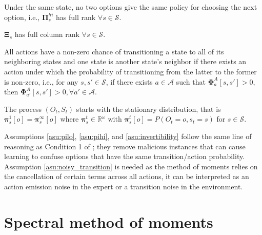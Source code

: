 \begin{assumption}\label{asu:pihi}
Under the same state, no two options give the same policy for choosing the next option, i.e., $\bm{\Pi}^{hi}_s$ has full rank $\forall s\in\mathcal{S}$. 
\end{assumption}

\begin{assumption}\label{asu:invertibility}
$\bm{\Xi}_s$ has full column rank $\forall s\in\mathcal{S}$.
\end{assumption}

\begin{assumption}\label{asu:noisy_transition}
All actions have a non-zero chance of transitioning a state to all of its neighboring states and one state is another state's neighbor if there exists an action under which the probability of transitioning from the latter to the former is non-zero, i.e., for any $s,s'\in\mathcal{S}$, if there exists $a\in\mathcal{A}$ such that $\bm{\Phi}^A_a[s,s']>0$, then $\bm{\Phi}^A_{a'}[s,s']>0,\forall a'\in\mathcal{A}.$
\end{assumption}

\begin{assumption}[Stationary]\label{asu:stationary}
The process $(O_t,S_t)$ starts with the stationary distribution, that is $\bm{\pi}^1_s[o]=\bm{\pi}^\infty_s[o]$ where $\bm{\pi}^t_s\in\mathbb{R}^\omega$ with $\bm{\pi}^t_s[o]=P(O_t=o,s_t=s)$ for $s \in \mathcal{S}$.
\end{assumption}
\begin{remark}
Assumptions \ref{asu:pilo}, \ref{asu:pihi}, and \ref{asu:invertibility} follow the same line of reasoning as Condition 1 of \cite{hsu08}; they remove malicious instances that can cause learning to confuse options that have the same transition/action probability. Assumption \ref{asu:noisy_transition} is needed as the method of moments relies on the cancellation of certain terms across all actions, it can be interpreted as an action emission noise in the expert or a transition noise in the environment.
\end{remark}

\section{Spectral method of moments}

